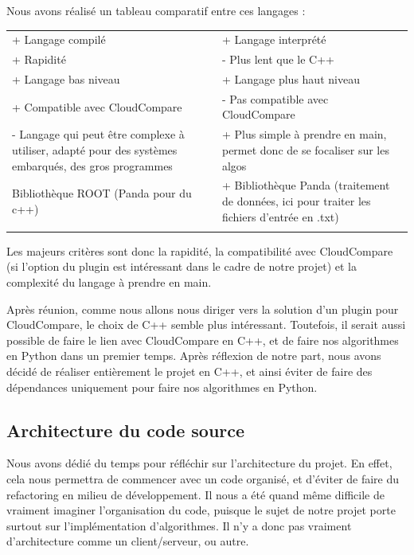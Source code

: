 \documentclass[12pt,titlepage,french]{article}
\begin{document}
Nous avons réalisé un tableau comparatif entre ces langages : \\

\noindent\begin{tabu} to \textwidth {X[c]X[c]}\toprule
  &\\\toprule
+ Langage compilé
& + Langage interprété\\\midrule
+ Rapidité
& - Plus lent que le C++\\\midrule
+ Langage bas niveau
& + Langage plus haut niveau\\\midrule
+ Compatible avec CloudCompare
& - Pas compatible avec CloudCompare\\\midrule
- Langage qui peut être complexe à utiliser, adapté pour des systèmes embarqués, des gros programmes
& + Plus simple à prendre en main, permet donc de se focaliser sur les algos\\\midrule
 Bibliothèque ROOT (Panda pour du c++)
& + Bibliothèque Panda (traitement de données, ici pour traiter les fichiers d'entrée en .txt)\\\bottomrule  \\
\end{tabu}

Les majeurs critères sont donc la rapidité, la compatibilité avec CloudCompare (si l'option du plugin est intéressant dans le cadre de notre projet) et la complexité du langage à prendre en main.

Après réunion, comme nous allons nous diriger vers la solution d'un plugin pour CloudCompare, le choix de C++ semble plus intéressant. Toutefois, il serait aussi possible de faire le lien avec CloudCompare en C++, et de faire nos algorithmes en Python dans un premier temps. Après réflexion de notre part, nous avons décidé de réaliser entièrement le projet en C++, et ainsi éviter de faire des dépendances uniquement pour faire nos algorithmes en Python.

\subsection{Architecture du code source}

Nous avons dédié du temps pour réfléchir sur l'architecture du projet. En effet, cela nous permettra de commencer avec un code organisé, et d'éviter de faire du refactoring en milieu de développement. Il nous a été quand même difficile de vraiment imaginer l'organisation du code, puisque le sujet de notre projet porte surtout sur l'implémentation d'algorithmes. Il n'y a donc pas vraiment d'architecture comme un client/serveur, ou autre.
\end{document}
